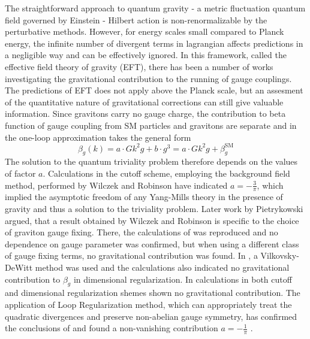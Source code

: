 \documentclass[11pt, a4paper]{article}
\begin{document}
\pagebreak
The straightforward approach to quantum gravity - a metric fluctuation quantum field governed by Einstein - Hilbert action
is non-renormalizable by the perturbative methods\cite{book}. However, for energy scales small
compared to Planck energy, the infinite number of divergent terms in lagrangian affects predictions in a negligible way and can be effectively ignored.
In this framework, called the effective field theory of gravity (EFT), there has been a number of works investigating
the gravitational contribution to the running of gauge couplings. The predictions of EFT does not apply above
the Planck scale, but an assesment of the quantitative nature of gravitational corrections can still give valuable information.
Since gravitons carry no gauge charge, the contribution to beta function of gauge coupling from SM particles and gravitons are separate
and in the one-loop approximation takes the general form
\begin{equation}
    \beta_g(k) = a \cdot G k^2 g + b \cdot g^3 = a \cdot G k^2 g + \beta_{g}^{\text{SM}}
    \label{betawilczek}
\end{equation}
The solution to the quantum triviality problem therefore depends on the values of factor $a$.
Calculations in the cutoff scheme, employing the background field method, performed by Wilczek and Robinson \cite{wilczek} have indicated
$a = - \frac{3}{\pi} $, which implied the asymptotic freedom of any Yang-Mills theory in the presence of gravity and thus a solution to the triviality problem.
Later work by Pietrykowski \cite{pietrykowski} argued, that a result obtained by Wilczek and Robinson is specific to the choice of graviton gauge fixing.
There, the calculations of \cite{wilczek} was reproduced and no dependence on gauge parameter was confirmed, but when using a different class of gauge fixing terms, no gravitational contribution was found. 
In \cite{toms}, a Vilkovsky-DeWitt method was used and the calculations also indicated no gravitational contribution to $\beta_g$ in dimensional regularization. 
In \cite{absence} calculations in both cutoff and dimensional regularization shemes shown no gravitational contribution.
The application of Loop Regularization method, which can appropriately treat the quadratic divergences and preserve non-abelian gauge symmetry,
has confirmed the conclusions of \cite{wilczek} and found a non-vanishing contribution $a = -\frac{1}{\pi} $ \cite{tang}.
\end{document}
